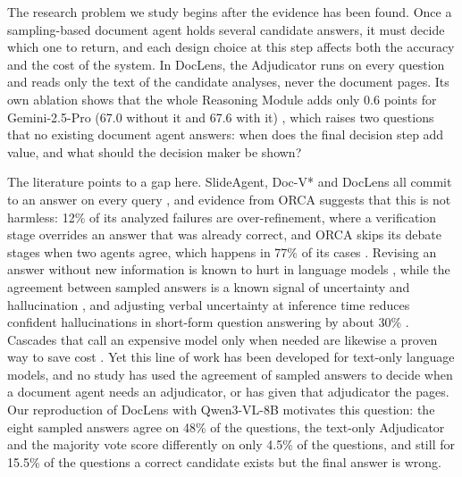 The research problem we study begins after the evidence has been found. Once a sampling-based document agent holds several candidate answers, it must decide which one to return, and each design choice at this step affects both the accuracy and the cost of the system. In DocLens, the Adjudicator runs on every question and reads only the text of the candidate analyses, never the document pages. Its own ablation shows that the whole Reasoning Module adds only 0.6 points for Gemini-2.5-Pro (67.0 without it and 67.6 with it) \cite{zhu2025doclens}, which raises two questions that no existing document agent answers: when does the final decision step add value, and what should the decision maker be shown?

The literature points to a gap here. SlideAgent, Doc-V* and DocLens all commit to an answer on every query \cite{slideagent,docvstar,zhu2025doclens}, and evidence from ORCA suggests that this is not harmless: 12\% of its analyzed failures are over-refinement, where a verification stage overrides an answer that was already correct, and ORCA skips its debate stages when two agents agree, which happens in 77\% of its cases \cite{orca}. Revising an answer without new information is known to hurt in language models \cite{huang2024selfcorrect}, while the agreement between sampled answers is a known signal of uncertainty and hallucination \cite{kuhn2023semantic,manakul2023selfcheckgpt}, and adjusting verbal uncertainty at inference time reduces confident hallucinations in short-form question answering by about 30\% \cite{ji2025verbal}. Cascades that call an expensive model only when needed are likewise a proven way to save cost \cite{chen2024frugalgpt}. Yet this line of work has been developed for text-only language models, and no study has used the agreement of sampled answers to decide when a document agent needs an adjudicator, or has given that adjudicator the pages. Our reproduction of DocLens with Qwen3-VL-8B motivates this question: the eight sampled answers agree on 48\% of the questions, the text-only Adjudicator and the majority vote score differently on only 4.5\% of the questions, and still for 15.5\% of the questions a correct candidate exists but the final answer is wrong.

